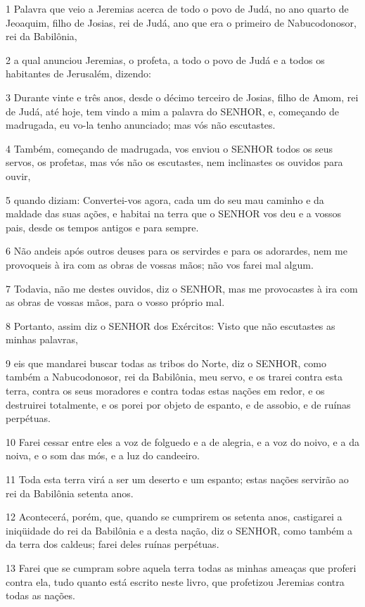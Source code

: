 \par 1 Palavra que veio a Jeremias acerca de todo o povo de Judá, no ano quarto de Jeoaquim, filho de Josias, rei de Judá, ano que era o primeiro de Nabucodonosor, rei da Babilônia,
\par 2 a qual anunciou Jeremias, o profeta, a todo o povo de Judá e a todos os habitantes de Jerusalém, dizendo:
\par 3 Durante vinte e três anos, desde o décimo terceiro de Josias, filho de Amom, rei de Judá, até hoje, tem vindo a mim a palavra do SENHOR, e, começando de madrugada, eu vo-la tenho anunciado; mas vós não escutastes.
\par 4 Também, começando de madrugada, vos enviou o SENHOR todos os seus servos, os profetas, mas vós não os escutastes, nem inclinastes os ouvidos para ouvir,
\par 5 quando diziam: Convertei-vos agora, cada um do seu mau caminho e da maldade das suas ações, e habitai na terra que o SENHOR vos deu e a vossos pais, desde os tempos antigos e para sempre.
\par 6 Não andeis após outros deuses para os servirdes e para os adorardes, nem me provoqueis à ira com as obras de vossas mãos; não vos farei mal algum.
\par 7 Todavia, não me destes ouvidos, diz o SENHOR, mas me provocastes à ira com as obras de vossas mãos, para o vosso próprio mal.
\par 8 Portanto, assim diz o SENHOR dos Exércitos: Visto que não escutastes as minhas palavras,
\par 9 eis que mandarei buscar todas as tribos do Norte, diz o SENHOR, como também a Nabucodonosor, rei da Babilônia, meu servo, e os trarei contra esta terra, contra os seus moradores e contra todas estas nações em redor, e os destruirei totalmente, e os porei por objeto de espanto, e de assobio, e de ruínas perpétuas.
\par 10 Farei cessar entre eles a voz de folguedo e a de alegria, e a voz do noivo, e a da noiva, e o som das mós, e a luz do candeeiro.
\par 11 Toda esta terra virá a ser um deserto e um espanto; estas nações servirão ao rei da Babilônia setenta anos.
\par 12 Acontecerá, porém, que, quando se cumprirem os setenta anos, castigarei a iniqüidade do rei da Babilônia e a desta nação, diz o SENHOR, como também a da terra dos caldeus; farei deles ruínas perpétuas.
\par 13 Farei que se cumpram sobre aquela terra todas as minhas ameaças que proferi contra ela, tudo quanto está escrito neste livro, que profetizou Jeremias contra todas as nações.
